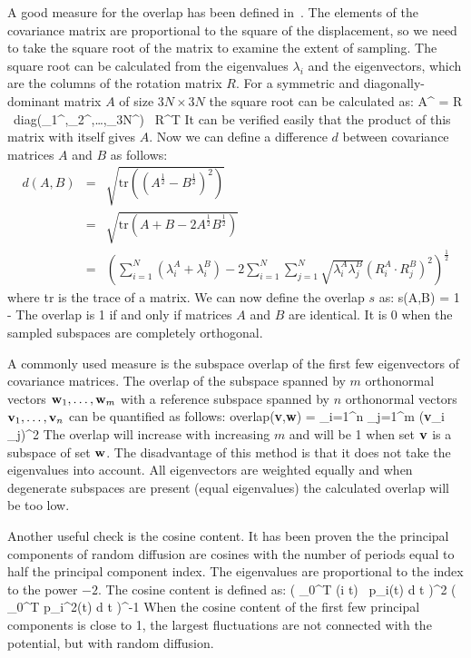 {A good measure for the overlap has been defined in~\cite{Hess2002b}.
The elements of the covariance matrix are proportional to the square
of the displacement, so we need to take the square root of the matrix
to examine the extent of sampling. The square root can be
calculated from the eigenvalues $\lambda_i$ and the eigenvectors,
which are the columns of the rotation matrix $R$.
For a symmetric and diagonally-dominant matrix $A$ of size $3N \times 3N$
the square root can be calculated as:
\beq
A^ = 
R \, \mbox{diag}(\lambda_1^,\lambda_2^,\ldots,\lambda_{3N}^) \, R^T
\eeq
It can be verified easily that the product of this matrix with itself gives
$A$.
Now we can define a difference $d$ between covariance matrices $A$ and $B$
as follows:
\begin{eqnarray}
d(A,B) & = & \sqrt{\mbox{tr}\left(\left(A^\frac{1}{2} - B^\frac{1}{2}\right)^2\right)
}
\\ & = &
\sqrt{\mbox{tr}\left(A + B - 2 A^\frac{1}{2} B^\frac{1}{2}\right)}
\\ & = &
\left( \sum_{i=1}^N \left( \lambda_i^A + \lambda_i^B \right)
- 2 \sum_{i=1}^N \sum_{j=1}^N \sqrt{\lambda_i^A \lambda_j^B}
\left(R_i^A \cdot R_j^B\right)^2 \right)^\frac{1}{2}
\end{eqnarray}
where tr is the trace of a matrix.
We can now define the overlap $s$ as:
\beq
s(A,B) = 1 - 
\eeq
The overlap is 1 if and only if matrices $A$ and $B$ are identical.
It is 0 when the sampled subspaces are completely orthogonal.

A commonly used measure is the subspace overlap of the first few
eigenvectors of covariance matrices.
The overlap of the subspace spanned by $m$ orthonormal vectors 
${\bf w}_1,\ldots,{\bf w}_m$ with a reference subspace spanned by 
$n$ orthonormal vectors ${\bf v}_1,\ldots,{\bf v}_n$
can be quantified as follows:
\beq
\mbox{overlap}({\bf v},{\bf w}) =
 \sum_{i=1}^n \sum_{j=1}^m ({\bf v}_i _j)^2
\eeq
The overlap will increase with increasing $m$ and will be 1 when
set ${\bf v}$ is a subspace of set ${\bf w}$.
The disadvantage of this method is that it does not take the eigenvalues
into account. All eigenvectors are weighted equally and when
degenerate subspaces are present (equal eigenvalues) the calculated overlap
will be too low.

Another useful check is the cosine content. It has been proven the
the principal components of random diffusion are cosines with the number of
periods equal to half the principal component index\cite{Hess2000,Hess2002b}.
The eigenvalues are proportional to the index to the power $-2$.
The cosine content is defined as:
\beq
{}
\left( \int_0^T \cos(i \pi t) \, p_i(t) \mbox{d} t \right)^2
\left( \int_0^T p_i^2(t) \mbox{d} t \right)^{-1}
\eeq
When the cosine content of the first few principal components
is close to 1, the largest fluctuations are not connected with
the potential, but with random diffusion.

}
